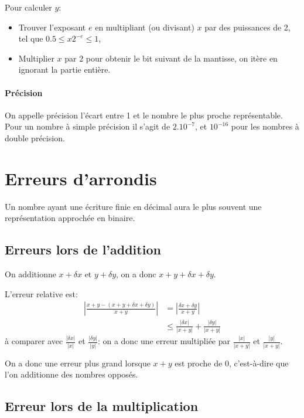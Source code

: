 \documentclass[a4paper,10pt,french,openany]{memoir}
\newcommand{\absfrac}[2]{\frac{\left|#1\right|}{\left|#2\right|}}
\begin{document}
Pour calculer $y$:
\begin{itemize}
 \item Trouver l'exposant $e$ en multipliant (ou divisant) $x$ par des puissances de 2, tel que $0.5 \leq x 2^{-e} \leq 1$,
 \item Multiplier $x$ par 2 pour obtenir le bit suivant de la mantisse, on itère en ignorant la partie entière.
\end{itemize}


\paragraph{Précision}
On appelle précision l'écart entre 1 et le nombre le plus proche représentable. Pour un nombre à simple précision il s'agit de $2.10^{-7}$, et $10^{-16}$ pour les nombres à double précision.

\section{Erreurs d'arrondis}

Un nombre ayant une écriture finie en décimal aura le plus souvent une représentation approchée en binaire.

\subsection{Erreurs lors de l'addition}

On additionne $x + \delta x$ et $y + \delta y$, on a donc $x + y + \delta x + \delta y$.

L'erreur relative est:
\begin{align*}
 \left|\frac{x+y-(x+y+\delta x+\delta y)}{x+y}\right| & = \left| \frac{\delta x + \delta y}{x+y} \right| \\
 & \leq \frac{\left|\delta x\right|}{\left|x+y\right|} + \frac{\left|\delta y\right|}{\left|x+y\right|}
\end{align*}
à comparer avec $\absfrac{\delta x}{x}$ et $\absfrac{\delta y}{y}$: on a donc une erreur multipliée par $\absfrac{x}{x+y}$ et $\absfrac{y}{x+y}$.

On a donc une erreur plus grand lorsque $x+y$ est proche de 0, c'est-à-dire que l'on additionne des nombres opposés.

\subsection{Erreur lors de la multiplication}
\end{document}

